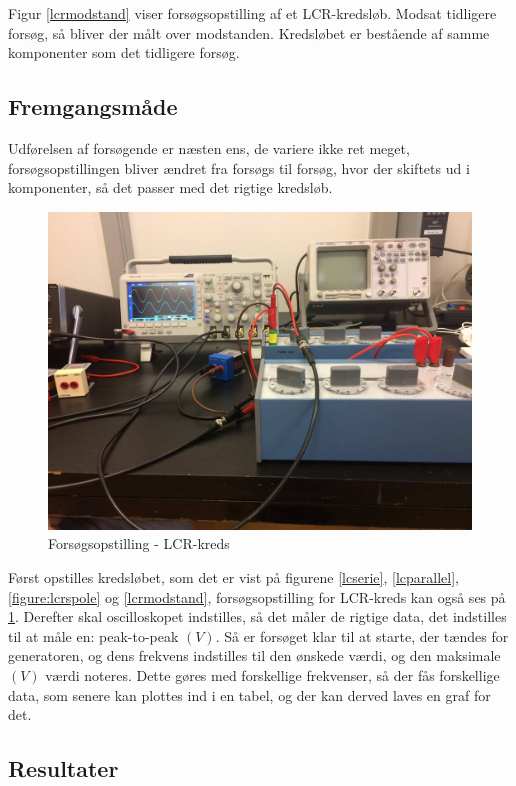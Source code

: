 Figur \ref{lcrmodstand} viser forsøgsopstilling af et LCR-kredsløb. Modsat tidligere forsøg, så bliver der målt over modstanden. Kredsløbet er bestående af samme komponenter som det tidligere forsøg.

\subsection{Fremgangsmåde}

Udførelsen af forsøgende er næsten ens, de variere ikke ret meget, forsøgsopstillingen bliver ændret fra forsøgs til forsøg, hvor der skiftets ud i komponenter, så det passer med det rigtige kredsløb.

\begin{figure}[H]
\centering
\includegraphics[scale=0.2]{Vildledning/Schematics/virkeligtforsg}
\caption{Forsøgsopstilling - LCR-kreds}
\label{vforsg}
\end{figure}

Først opstilles kredsløbet, som det er vist på figurene \ref{lcserie}, \ref{lcparallel}, \ref{figure:lcrspole} og \ref{lcrmodstand}, forsøgsopstilling for LCR-kreds kan også ses på \ref{vforsg}. Derefter skal oscilloskopet indstilles, så det måler de rigtige data, det indstilles til at måle en: peak-to-peak $(V)$. Så er forsøget klar til at starte, der tændes for generatoren, og dens frekvens indstilles til den ønskede værdi, og den maksimale $(V)$ værdi noteres. Dette gøres med forskellige frekvenser, så der fås forskellige data, som senere kan plottes ind i en tabel, og der kan derved laves en graf for det.

\subsection{Resultater}


